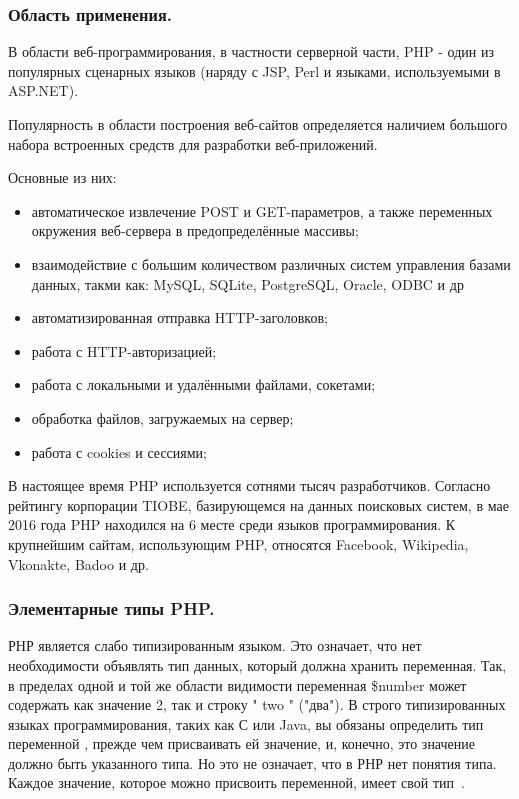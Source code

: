 \subsubsection{Область применения. }
\label{sub:practice:whereis_php}
В области веб-программирования, в частности серверной части, PHP - один из популярных сценарных языков (наряду с JSP, Perl и языками, используемыми в ASP.NET).

Популярность в области построения веб-сайтов определяется наличием большого набора встроенных средств для разработки веб-приложений. 

Основные из них:
\begin{itemize}
  \item автоматическое извлечение POST и GET-параметров, а также переменных окружения веб-сервера в предопределённые массивы;
  \item взаимодействие с большим количеством различных систем управления базами данных, такми как: MySQL,  SQLite, PostgreSQL, Oracle, ODBC и др
  \item автоматизированная отправка HTTP-заголовков;
  \item работа с HTTP-авторизацией;
  \item работа с локальными и удалёнными файлами, сокетами;
  \item обработка файлов, загружаемых на сервер;
  \item работа с cookies и сессиями;
\end{itemize}

В настоящее время PHP используется сотнями тысяч разработчиков. Согласно рейтингу корпорации TIOBE, базирующемся на данных поисковых систем, в мае 2016 года PHP находился на 6 месте среди языков программирования. К крупнейшим сайтам, использующим PHP, относятся Facebook, Wikipedia, Vkonakte, Badoo и др.



\subsubsection{Элементарные типы PHP. }
\label{sub:practice:types_php}

РНР является слабо типизированным языком. Это означает, что нет необходимости объявлять тип данных, который должна хранить переменная. Так, в пределах одной и той же области видимости переменная \$number может содержать как значение 2, так и строку " two " ("два"). В строго типизированных языках программирования, таких как С или Java, вы обязаны определить тип переменной , прежде чем присваивать ей значение, и, конечно, это значение должно быть указанного типа. Но это не означает, что в РНР нет понятия типа. Каждое значение, которое можно присвоить переменной, имеет свой тип~\cite{zandstra_2015}.

